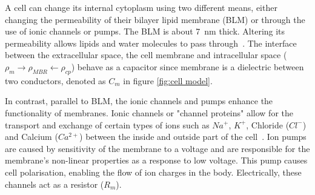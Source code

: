 A cell can change its internal cytoplasm using two different means, either changing the permeability of their bilayer lipid membrane (BLM) or through the use of ionic channels or pumps. The BLM is about \SI{7}{\nano\meter} thick. Altering its permeability allows lipids and water molecules to pass through~\cite{ivorra2003bioimpedance}. The interface between the extracellular space, the cell membrane and intracellular space ($\rho_m \rightarrow \rho_{MBR} \leftarrow \rho_{cp}$) behave as a capacitor since membrane is a dielectric between two conductors, denoted as $C_m$ in figure \ref{fig:cell model}.

In contrast, parallel to BLM, the ionic channels and pumps enhance the functionality of membranes. Ionic channels or "channel proteins" allow for the transport and exchange of certain types of ions such as $Na^{+}$, $K^{+}$, Chloride ($Cl^{-}$) and Calcium ($Ca^{2+}$) between the inside and outside part of the cell~\cite{lvovich2012impedance}. Ion pumps are caused by sensitivity of the membrane to a voltage and are responsible for the membrane's non-linear properties as a response to low voltage. This pump causes cell polarisation, enabling the flow of ion charges in the body. Electrically, these channels act as a resistor ($R_m$).

